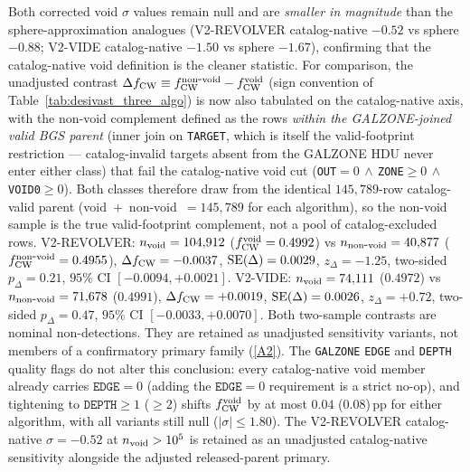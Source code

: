 \documentclass[aps,prd,twocolumn,superscriptaddress,showpacs,preprintnumbers,nofootinbib,longbibliography,floatfix]{revtex4-2}
\newcommand{\repoBase}{https://github.com/Hubify-Projects/bigbounce/blob/main}
\begin{document}
Both corrected void $\sigma$ values remain null and are
\emph{smaller in magnitude} than the sphere-approximation analogues
(V2-REVOLVER catalog-native $-0.52$ vs sphere $-0.88$; V2-VIDE
catalog-native $-1.50$ vs sphere $-1.67$), confirming that the
catalog-native void definition is the cleaner statistic.
For comparison, the unadjusted contrast $\Delta f_{\rm CW} \equiv
f_{\rm CW}^{\rm non\mbox{-}void} - f_{\rm CW}^{\rm void}$
(sign convention of Table~\ref{tab:desivast_three_algo}) is now also
tabulated on the catalog-native axis, with the non-void complement
defined as the rows \emph{within the GALZONE-joined valid BGS parent}
(inner join on \texttt{TARGET}, which is itself the valid-footprint
restriction --- catalog-invalid targets absent from the GALZONE HDU
never enter either class) that fail the catalog-native void cut
(\texttt{OUT}$=0\,\wedge\,$\texttt{ZONE}$\geq 0\,\wedge\,$%
\texttt{VOID0}$\geq 0$). Both classes therefore draw from the identical
$145{,}789$-row catalog-valid parent (void~$+$~non-void~$=145{,}789$ for
each algorithm), so the non-void sample is the true valid-footprint
complement, not a pool of catalog-excluded rows. V2-REVOLVER: $n_{\rm void} = 104{,}912$
($f_{\rm CW}^{\rm void} = 0.4992$) vs $n_{\rm non\mbox{-}void} =
40{,}877$ ($f_{\rm CW}^{\rm non\mbox{-}void} = 0.4955$),
$\Delta f_{\rm CW} = -0.0037$, ${\rm SE}(\Delta) = 0.0029$,
$z_\Delta = -1.25$, two-sided $p_\Delta = 0.21$, $95\%$ CI
$[-0.0094, +0.0021]$. V2-VIDE: $n_{\rm void} = 74{,}111$
($0.4972$) vs $n_{\rm non\mbox{-}void} = 71{,}678$ ($0.4991$),
$\Delta f_{\rm CW} = +0.0019$, ${\rm SE}(\Delta) = 0.0026$,
$z_\Delta = +0.72$, two-sided $p_\Delta = 0.47$, $95\%$ CI
$[-0.0033, +0.0070]$. Both two-sample contrasts are nominal
non-detections. They are retained as unadjusted sensitivity variants,
not members of a confirmatory primary family
(\href{\repoBase/pipelines/p5\_desi\_chirality/outputs/30\_ext4\_galzone\_complement\_contrasts.json}{[A2]}). The
\texttt{GALZONE} \texttt{EDGE} and \texttt{DEPTH} quality flags do not
alter this conclusion: every catalog-native void member already
carries $\texttt{EDGE} = 0$ (adding the $\texttt{EDGE} = 0$
requirement is a strict no-op), and tightening to
$\texttt{DEPTH} \geq 1$ ($\geq 2$) shifts $f_{\rm CW}^{\rm void}$ by
at most $0.04$ ($0.08$)\,pp for either algorithm, with all variants
still null ($|\sigma| \leq 1.80$). The V2-REVOLVER
catalog-native $\sigma = -0.52$ at $n_{\rm void} > 10^{5}$ is retained
as an unadjusted catalog-native sensitivity alongside the adjusted
released-parent primary.
\end{document}
